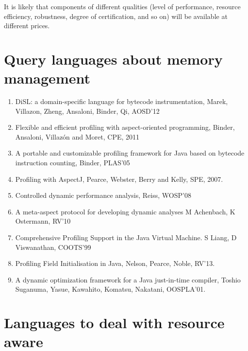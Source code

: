 It is likely that components of different qualities (level of performance, resource efficiency,
robustness, degree of certification, and so on) will be available at different
prices.

\section{Query languages about memory management}

\begin{enumerate}
\item DiSL: a domain-specific language for bytecode instrumentation, Marek, Villazon, Zheng, Ansaloni, Binder, Qi, AOSD'12

\item Flexible and efficient profiling with aspect-oriented programming, Binder, Ansaloni, Villazón and Moret, CPE, 2011

\item A portable and customizable profiling framework for Java based on bytecode instruction counting, Binder, PLAS'05

\item Profiling with AspectJ, Pearce, Webster, Berry and Kelly, SPE, 2007.

\item Controlled dynamic performance analysis, Reiss, WOSP'08

\item A meta-aspect protocol for developing dynamic analyses M Achenbach, K Ostermann, RV'10

\item Comprehensive Profiling Support in the Java Virtual Machine. S Liang, D Viswanathan, COOTS'99

\item Profiling Field Initialisation in Java, Nelson, Pearce, Noble, RV'13.

\item A dynamic optimization framework for a Java just-in-time compiler, Toshio Suganuma, Yasue, Kawahito, Komatsu, Nakatani, OOSPLA'01.
\end{enumerate}



\section{Languages to deal with resource aware}

